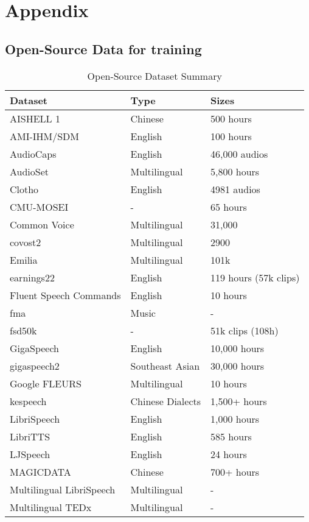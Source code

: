 \section{Appendix}


\subsection{Open-Source Data for training}

\begin{table}[ht]
\centering
\caption{Open-Source Dataset Summary}
\label{table:datasets}
\begin{tabular}{l l l}  %
\toprule
Dataset & Type & Sizes  \\
\midrule
AISHELL 1 & Chinese & 500 hours  \\ 
AMI-IHM/SDM & English & 100 hours \\ 
AudioCaps & English & 46,000 audios   \\ 
AudioSet & Multilingual & 5,800 hours   \\ 
Clotho & English & 4981 audios   \\ 
CMU-MOSEI & - & 65 hours  \\ 
Common Voice & Multilingual & 31,000   \\ 
covost2 & Multilingual & 2900   \\ 
Emilia & Multilingual & 101k   \\ 
earnings22 & English & 119 hours (57k clips)   \\ 
Fluent Speech Commands & English & 10 hours  \\ 
fma & Music & -   \\ 
fsd50k & - & 51k clips (108h)   \\ 
GigaSpeech & English & 10,000 hours   \\ 
gigaspeech2 & Southeast Asian & 30,000 hours   \\ 
Google FLEURS & Multilingual & 10 hours   \\ 
kespeech & Chinese Dialects & 1,500+ hours   \\ 
LibriSpeech & English & 1,000 hours   \\ 
LibriTTS & English & 585 hours   \\ 
LJSpeech & English & 24 hours   \\ 
MAGICDATA & Chinese & 700+ hours   \\ 
Multilingual LibriSpeech & Multilingual & -   \\ 
Multilingual TEDx & Multilingual & -   \\ 

\end{tabular}
\end{table}
